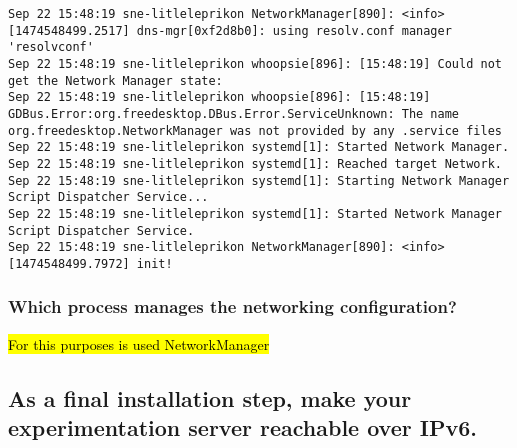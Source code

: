 \documentclass[a4paper,11pt]{article}
\theoremstyle{mytheor}
\begin{document}
\begin{lstlisting}
Sep 22 15:48:19 sne-litleleprikon NetworkManager[890]: <info>  [1474548499.2517] dns-mgr[0xf2d8b0]: using resolv.conf manager 'resolvconf'
Sep 22 15:48:19 sne-litleleprikon whoopsie[896]: [15:48:19] Could not get the Network Manager state:
Sep 22 15:48:19 sne-litleleprikon whoopsie[896]: [15:48:19] GDBus.Error:org.freedesktop.DBus.Error.ServiceUnknown: The name org.freedesktop.NetworkManager was not provided by any .service files
Sep 22 15:48:19 sne-litleleprikon systemd[1]: Started Network Manager.
Sep 22 15:48:19 sne-litleleprikon systemd[1]: Reached target Network.
Sep 22 15:48:19 sne-litleleprikon systemd[1]: Starting Network Manager Script Dispatcher Service...
Sep 22 15:48:19 sne-litleleprikon systemd[1]: Started Network Manager Script Dispatcher Service.
Sep 22 15:48:19 sne-litleleprikon NetworkManager[890]: <info>  [1474548499.7972] init!

\end{lstlisting}

\subsubsection{Which process manages the networking configuration?}
\hl{For this purposes is used NetworkManager}

\subsection{As a final installation step, make your experimentation server reachable over IPv6.}
\end{document}
